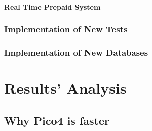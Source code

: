 			\subsubsection{Real Time Prepaid System}
			
		\subsection{Implementation of New Tests}%
		\subsection{Implementation of New Databases}%


\chapter{Results' Analysis}
	\section{Why Pico4 is faster}
